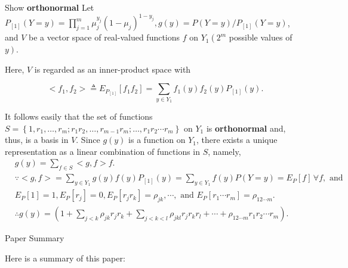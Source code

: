 \documentclass[UTF8,a4paper,10pt]{article}
\begin{document}
\begin{Problem}[]{Show  \textbf{orthonormal}}
Let $P_{[1]}(Y=y)=\prod_{j=1}^m \mu_j^{y_j}\left(1-\mu_j\right)^{1-y_j}, g(y)=P(Y=y) / P_{[1]}(Y=y)$, and $V$ be a vector space of real-valued functions $f$ on $Y_1\left(2^m\right.$ possible values of $\left.y\right)$. 

Here, $V$ is regarded as an inner-product space with

\[ <f_1, f_2>\triangleq E_{P_{[1]}}\left[f_1 f_2\right]=\sum_{y \in Y_1} f_1(y) f_2(y) P_{[1]}(y).\]

It follows easily that the set of functions $S=\left\{1, r_1, \ldots, r_m ; r_1 r_2, \ldots, r_{m-1} r_m ; \ldots, r_1 r_2 \cdots r_m\right\}$ on $Y_1$ is \textbf{orthonormal} and, thus, is a basis in $V$.
 Since $g(y)$ is a function on $Y_1$, there exists a unique representation as a linear combination of functions in $S$, namely,
$$
\begin{aligned}
& g(y)=\sum_{f \in S}<g, f>f . \\
& \because<g, f>=\sum_{y \in Y_1} g(y) f(y) P_{[1]}(y)=\sum_{y \in Y_1} f(y) P(Y=y)=E_P[f] \,\forall f, \text { and } \\
& E_P[1]=1, E_P\left[r_j\right]=0, E_P\left[r_j r_k\right]=\rho_{j k}, \cdots, \text { and } E_P\left[r_1 \cdots r_m\right]=\rho_{12 \cdots m} . \\
& \therefore g(y)=\left(1+\sum_{j<k} \rho_{j k} r_j r_k+\sum_{j<k<l} \rho_{j k l} r_j r_k r_l+\cdots+\rho_{12 \cdots m} r_1 r_2 \cdots r_m\right) .
\end{aligned}
$$
\end{Problem}

\pagebreak

Paper Summary


Here is a summary of this paper:
\end{document}
